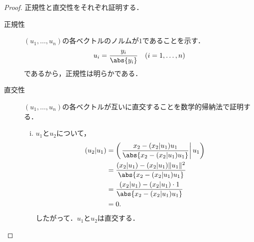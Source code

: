 \documentclass[a4paper,10pt,fleqn]{ltjsarticle}
\begin{document}
\begin{tleftbar}
    \begin{proof}
        正規性と直交性をそれぞれ証明する．
        \begin{description}
            \item[正規性] $(u_1, \ldots, u_n)$の各ベクトルのノルムが$1$であることを示す．
                  \[
                      u_i = \frac{y_i}{\abs{y_i}} \quad (i = 1, \ldots, n)
                  \]
                  であるから，正規性は明らかである．
            \item[直交性] $(u_1, \ldots, u_n)$の各ベクトルが互いに直交することを数学的帰納法で証明する．
                  \begin{enumerate}[(i)]
                      \item $u_1$と$u_2$について，
                            \begin{align*}
                                (u_2 | u_1) & = \left(\left. \frac{x_2 - (x_2 | u_1) u_1}{\abs{ x_2 - (x_2 | u_1) u_1 }} \right|u_1 \right) \\
                                            & = \frac{(x_2 | u_1) - (x_2 | u_1) \|u_1\|^2}{\abs{ x_2 - (x_2 | u_1) u_1 }}                   \\
                                            & = \frac{(x_2 | u_1) - (x_2 | u_1) \cdot 1}{\abs{ x_2 - (x_2 | u_1) u_1 }}                     \\
                                            & = 0.
                            \end{align*}
                            したがって．$u_1$と$u_2$は直交する．


\end{enumerate}
\end{description}
\end{proof}
\end{tleftbar}
\end{document}
